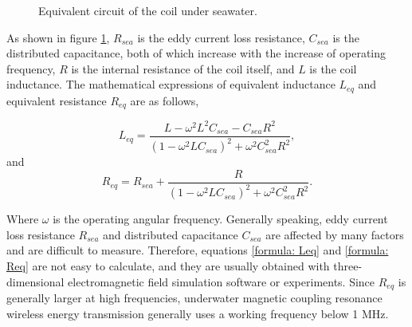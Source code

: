 \begin{figure}[htbp]
    \centering
    \caption{Equivalent circuit of the coil under seawater.}
    \label{fig:coil under seawater}
\end{figure}

As shown in figure \ref{fig:coil under seawater}, $R_{sea}$ is the eddy current loss resistance, $C_{sea}$ is the distributed capacitance, both of which increase with the increase of operating frequency, $R$ is the internal resistance of the coil itself, and $L$ is the coil inductance. The mathematical expressions of equivalent inductance $L_{eq}$ and equivalent resistance $R_{eq}$ are as follows,

\begin{equation}
    L_{eq} = \frac{L-\omega ^2 L^2C_{sea}- C_{sea}R^2}{(1-\omega ^2 LC_{sea})^2 + \omega^2C_{sea}^2R^2},
    \label{formula: Leq}
\end{equation}
and
\begin{equation}
    R_{eq} = R_{sea} + \frac{R}{(1-\omega^2LC_{sea})^2+\omega^2C_{sea}^2R^2}.
    \label{formula: Req}
\end{equation}

Where $\omega$ is the operating angular frequency. Generally speaking, eddy current loss resistance $R_{sea}$ and distributed capacitance $C_{sea}$ are affected by many factors and are difficult to measure. Therefore, equations \ref{formula: Leq} and \ref{formula: Req} are not easy to calculate, and they are usually obtained with three-dimensional electromagnetic field simulation software or experiments. Since $R_{eq}$ is generally larger at high frequencies, underwater magnetic coupling resonance wireless energy transmission generally uses a working frequency below 1 MHz.